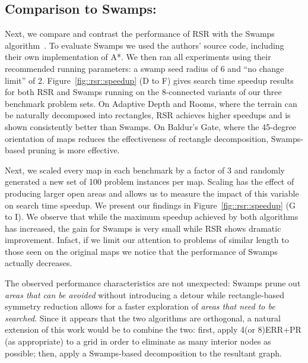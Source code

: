 \subsection{Comparison to Swamps:}
Next, we compare and contrast the performance of RSR with the Swamps
algorithm~\citep{pochter10}.  To evaluate Swamps we used the authors' source
code, including their own implementation of A*.  We then ran all experiments
using their recommended running parameters: a swamp seed radius of 6 and ``no
change limit'' of 2.
Figure~\ref{fig::rsr::speedup} (D to F) gives search time speedup results for both RSR
and Swamps running on the 8-connected variants of our three benchmark problem
sets. 
On Adaptive Depth and Rooms, where the terrain can be naturally decomposed into
rectangles, RSR achieves higher speedups and is shown consistently better than Swamps. 
On Baldur's Gate, where the 45-degree orientation of maps reduces the effectiveness
of rectangle decomposition, Swamps-based pruning is more effective. 
\par
Next, we scaled every map in each benchmark by a factor of 3 and randomly
generated a new set of 100 problem instances per map.  Scaling has the effect of
producing larger open areas and allows us to measure the impact of this variable
on search time speedup.  We present our findings in  Figure~\ref{fig::rsr::speedup} (G
to I).  We observe that while the maximum speedup achieved by both algorithms
has increased, the gain for Swamps is very small while RSR shows dramatic
improvement.  Infact, if we limit our attention to problems of similar length to
those seen on the original maps we notice that the performance of Swamps
actually decreases.
\par
The observed performance characteristics are not unexpected: Swamps prune out
\textit{areas that can be avoided} without introducing a detour while rectangle-based
symmetry reduction allows for a faster exploration of \textit{areas that need to be
searched}.  Since it appears that the two algorithms are orthogonal, a natural
extension of this work would be to combine the two: first, apply 4(or 8)ERR+PR
(as appropriate) to a grid in order to eliminate as many interior nodes as
possible; then, apply a Swamps-based decomposition to the resultant graph.



